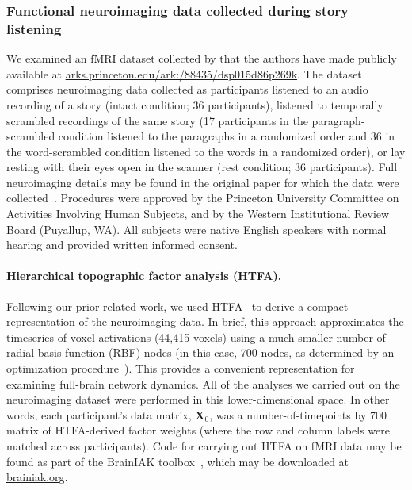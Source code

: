 \documentclass[english]{article}
\begin{document}
\subsubsection*{Functional neuroimaging data collected during story
  listening}
We examined an fMRI dataset collected by \cite{SimoEtal16} that the
authors have made publicly available at
\href{http://arks.princeton.edu/ark:/88435/dsp015d86p269k}{arks.princeton.edu/ark:/88435/dsp015d86p269k}.  The dataset
comprises neuroimaging data collected as participants listened
to an audio recording of a story (intact condition; 36 participants),
listened to temporally scrambled recordings of the same story (17
participants in the paragraph-scrambled condition listened to the
paragraphs in a randomized order and 36 in the word-scrambled
condition listened to the words in a randomized order), or lay resting
with their eyes open in the scanner (rest condition; 36
participants).  Full neuroimaging details may be found in the original
paper for which the data were collected~\cite{SimoEtal16}. Procedures
were approved by the Princeton University Committee on Activities
Involving Human Subjects, and by the Western Institutional Review Board (Puyallup, WA). All subjects were native English speakers with normal hearing and provided written informed consent.

\paragraph{Hierarchical topographic factor analysis (HTFA).}
Following our prior related work, we used HTFA~\cite{MannEtal18} to
derive a compact representation of the neuroimaging data.  In brief,
this approach approximates the timeseries of voxel activations (44,415
voxels) using a much smaller number of radial basis function (RBF)
nodes (in this case, 700 nodes, as determined by an optimization
procedure~\cite{MannEtal18}).  This provides a convenient
representation for examining full-brain network dynamics.  All of the
analyses we carried out on the neuroimaging dataset were performed in
this lower-dimensional space.  In other words, each participant's data
matrix, $\mathbf{X}_0$, was a number-of-timepoints by 700 matrix of
HTFA-derived factor weights (where the row and column labels were
matched across participants).  Code for carrying out HTFA on fMRI data
may be found as part of the BrainIAK toolbox~\cite{CapoEtal17}, which
may be downloaded at \href{https://brainiak.org/}{brainiak.org}.
\end{document}
